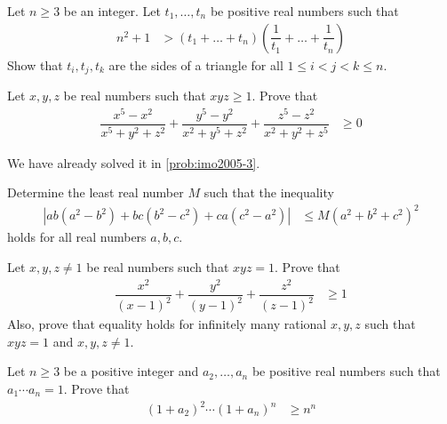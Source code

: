 \documentclass{subfile}
\begin{document}
		\begin{problem}
			Let $n\geq3$ be an integer. Let $t_{1},\ldots,t_{n}$ be positive real numbers such that
				\begin{align*}
					n^{2}+1
						& > (t_{1}+\ldots+t_{n})\left(\dfrac{1}{t_{1}}+\ldots+\dfrac{1}{t_{n}}\right)
				\end{align*}
			Show that $t_{i},t_{j},t_{k}$ are the sides of a triangle for all $1\leq i< j < k\leq n$.
		\end{problem}
	
		\begin{problem}
			Let $x,y,z$ be real numbers such that $xyz\geq1$. Prove that
				\begin{align*}
					\dfrac{x^{5}-x^{2}}{x^{5}+y^{2}+z^{2}}+\dfrac{y^{5}-y^{2}}{x^{2}+y^{5}+z^{2}}+\dfrac{z^{5}-z^{2}}{x^{2}+y^{2}+z^{5}}
						& \geq0
				\end{align*}
			
				\begin{solution}
					We have already solved it in \autoref{prob:imo2005-3}.
				\end{solution}
		\end{problem}
		
		\begin{problem}
			Determine the least real number $M$ such that the inequality
				\begin{align*}
					\left|ab\left(a^{2}-b^{2}\right)+bc\left(b^{2}-c^{2}\right)+ca\left(c^{2}-a^{2}\right)\right|
						& \leq M(a^{2}+b^{2}+c^{2})^{2}
				\end{align*}
			holds for all real numbers $a,b,c$.
		\end{problem}
	
		\begin{problem}
			Let $x,y,z\neq1$ be real numbers such that $xyz=1$. Prove that
				\begin{align*}
					\dfrac{x^{2}}{(x-1)^{2}}+\dfrac{y^{2}}{(y-1)^{2}}+\dfrac{z^{2}}{(z-1)^{2}}
						& \geq1
				\end{align*}
			Also, prove that equality holds for infinitely many rational $x,y,z$ such that $xyz=1$ and $x,y,z\neq1$.
		\end{problem}
	
		\begin{problem}
			Let $n\geq3$ be a positive integer and $a_2,\ldots,a_n$ be positive real numbers such that $a_1\cdots a_n=1$. Prove that
				\begin{align*}
					(1+a_2)^{2}\cdots(1+a_n)^{n}
						& \geq n^{n}
				\end{align*}
		\end{problem}
	
\end{document}
